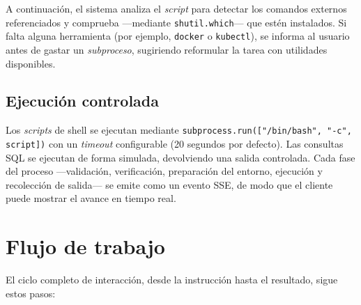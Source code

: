 \documentclass[12pt,a4paper]{article}
\begin{document}
A continuación, el sistema analiza el \textit{script} para detectar los comandos
externos referenciados y comprueba —mediante \texttt{shutil.which}— que estén
instalados. Si falta alguna herramienta (por ejemplo, \texttt{docker} o
\texttt{kubectl}), se informa al usuario antes de gastar un \textit{subproceso},
sugiriendo reformular la tarea con utilidades disponibles.

\subsection{Ejecución controlada}

Los \textit{scripts} de shell se ejecutan mediante
\texttt{subprocess.run(["/bin/bash", "-c", script])} con un \textit{timeout}
configurable (20 segundos por defecto). Las consultas SQL se ejecutan de forma
simulada, devolviendo una salida controlada. Cada fase del proceso —validación,
verificación, preparación del entorno, ejecución y recolección de salida— se
emite como un evento SSE, de modo que el cliente puede mostrar el avance en
tiempo real.

\section{Flujo de trabajo}

El ciclo completo de interacción, desde la instrucción hasta el resultado, sigue
estos pasos:
\end{document}
